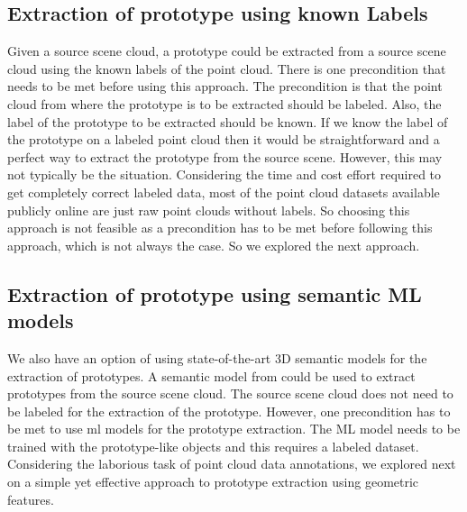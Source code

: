 \subsection{Extraction of prototype using known Labels}
Given a source scene cloud, a prototype could be extracted from a source scene cloud using the known labels of the point cloud. There is one precondition that needs to be met before using this approach. The precondition is that the point cloud from where the prototype is to be extracted should be labeled. Also, the label of the prototype to be extracted should be known. If we know the label of the prototype on a labeled point cloud then it would be straightforward and a perfect way to extract the prototype from the source scene. However, this may not typically be the situation. Considering the time and cost effort required to get completely correct labeled data, most of the point cloud datasets available publicly online are just raw point clouds without labels. So choosing this approach is not feasible as a precondition has to be met before following this approach, which is not always the case. So we explored the next approach.

\subsection{Extraction of prototype using semantic ML models}
We also have an option of using state-of-the-art 3D semantic models for the extraction of prototypes. A semantic model from \parencite{Chen2022} could be used to extract prototypes from the source scene cloud. The source scene cloud does not need to be labeled for the extraction of the prototype. However, one precondition has to be met to use \acrshort{ml} models for the prototype extraction. The ML model needs to be trained with the prototype-like objects and this requires a labeled dataset. Considering the laborious task of point cloud data annotations, we explored next on a simple yet effective approach to prototype extraction using geometric features.

